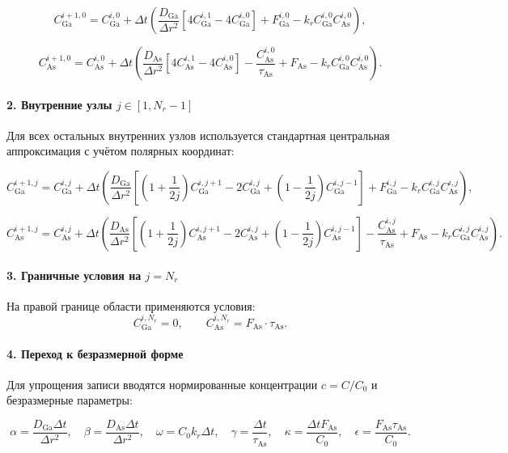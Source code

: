 \documentclass[14pt,oneside]{extarticle}
\begin{document}
\[
C_{\text{Ga}}^{i+1,0} = C_{\text{Ga}}^{i,0}
+ \Delta t \left(
\frac{D_{\text{Ga}}}{\Delta r^2} [4 C_{\text{Ga}}^{i,1} - 4 C_{\text{Ga}}^{i,0}]
+ F_{\text{Ga}}^{i,0}
- k_r C_{\text{Ga}}^{i,0} C_{\text{As}}^{i,0}
\right),
\]

\[
C_{\text{As}}^{i+1,0} = C_{\text{As}}^{i,0}
+ \Delta t \left(
\frac{D_{\text{As}}}{\Delta r^2} [4 C_{\text{As}}^{i,1} - 4 C_{\text{As}}^{i,0}]
- \frac{C_{\text{As}}^{i,0}}{\tau_{\text{As}}}
+ F_{\text{As}} - k_r C_{\text{Ga}}^{i,0} C_{\text{As}}^{i,0}
\right).
\]

\paragraph{2. Внутренние узлы \( j \in [1, N_r-1] \)}

Для всех остальных внутренних узлов используется стандартная центральная аппроксимация с учётом полярных координат:

\[
C_{\text{Ga}}^{i+1,j} = C_{\text{Ga}}^{i,j}
+ \Delta t \left(
\frac{D_{\text{Ga}}}{\Delta r^2}
\left[ \left(1+\frac{1}{2j}\right) C_{\text{Ga}}^{i,j+1}
- 2 C_{\text{Ga}}^{i,j}
+ \left(1-\frac{1}{2j}\right) C_{\text{Ga}}^{i,j-1} \right]
+ F_{\text{Ga}}^{i,j}
- k_r C_{\text{Ga}}^{i,j} C_{\text{As}}^{i,j}
\right),
\]

\[
C_{\text{As}}^{i+1,j} = C_{\text{As}}^{i,j}
+ \Delta t \left(
\frac{D_{\text{As}}}{\Delta r^2}
\left[ \left(1+\frac{1}{2j}\right) C_{\text{As}}^{i,j+1}
- 2 C_{\text{As}}^{i,j}
+ \left(1-\frac{1}{2j}\right) C_{\text{As}}^{i,j-1} \right]
- \frac{C_{\text{As}}^{i,j}}{\tau_{\text{As}}}
+ F_{\text{As}}
- k_r C_{\text{Ga}}^{i,j} C_{\text{As}}^{i,j}
\right).
\]

\paragraph{3. Граничные условия на \( j = N_r \)}

На правой границе области применяются условия:
\[
C_{\text{Ga}}^{i,N_r} = 0, \qquad C_{\text{As}}^{i,N_r} = F_{\text{As}} \cdot \tau_{\text{As}}.
\]

\paragraph{4. Переход к безразмерной форме}

Для упрощения записи вводятся нормированные концентрации \( c = C / C_0 \) и безразмерные параметры:

\[
\alpha = \frac{D_{\text{Ga}} \Delta t}{\Delta r^2}, \quad
\beta = \frac{D_{\text{As}} \Delta t}{\Delta r^2}, \quad
\omega = C_0 k_r \Delta t, \quad
\gamma = \frac{\Delta t}{\tau_{\text{As}}}, \quad
\kappa = \frac{\Delta t F_{\text{As}}}{C_0}, \quad
\epsilon = \frac{F_{\text{As}} \tau_{\text{As}}}{C_0}.
\]
\end{document}
